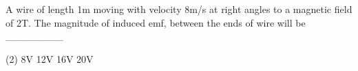 \item A wire of length 1m moving with velocity 8m/s at right angles to a magnetic field of 2T. The magnitude of induced emf, between the ends of wire will be \_\_\_\_\_\_\_\_
\begin{tasks}(2)
    \task 8V
    \task 12V
    \task 16V
    \task 20V
\end{tasks}